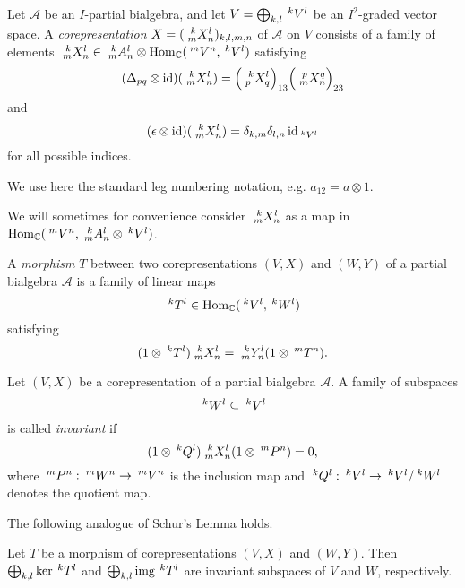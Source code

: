 \begin{Def} Let $\mathscr{A}$ be an $I$-partial bialgebra, and let $V=\bigoplus_{k,l} \Gru{V}{k}{l}$ be an $I^{2}$-graded vector space.
A \emph{corepresentation}  $X=(\Gr{X}{k}{l}{m}{n})_{k,l,m,n}$ of $\mathscr{A}$ on $V$ consists of a family of elements 
  $\Gr{X}{k}{l}{m}{n} \in \Gr{A}{k}{l}{m}{n} \otimes
  \Hom_\C(\Gru{V}{m}{n},\Gru{V}{k}{l})$
  satisfying
  \begin{align} \label{eq:rep-delta}
    (\Delta_{pq} \otimes \id)(\Gr{X}{k}{l}{m}{n}) =
    \Big{(}\Gr{X}{k}{l}{p}{q}\Big{)}_{13}\Big{(}\Gr{X}{p}{q}{m}{n}\Big{)}_{23}
  \end{align}
and   \[(\epsilon \otimes
    \id)(\Gr{X}{k}{l}{m}{n})=\delta_{k,m}\delta_{l,n}\id_{\Gru{V}{k}{l}}\] 
for all possible indices.
\end{Def} %

We use here the standard leg numbering notation, e.g. $a_{12} = a\otimes 1$.

We will sometimes for convenience consider $\Gr{X}{k}{l}{m}{n}$ as a map in $\Hom_\C(\Gru{V}{m}{n},\Gr{A}{k}{l}{m}{n}\otimes \Gru{V}{k}{l})$. %

\begin{Def}\label{DefMorphism} A \emph{morphism} $T$ between two corepresentations
$(V,X)$ and $(W,Y)$ of a partial bialgebra $\mathscr{A}$ is a family of linear maps
\[\Gru{T}{k}{l} \in
\Hom_\C(\Gru{V}{k}{l},\Gru{W}{k}{l})\]
satisfying \[(1 \otimes \Gru{T}{k}{l})\Gr{X}{k}{l}{m}{n} = \Gr{Y}{k}{l}{m}{n}(1 \otimes \Gru{T}{m}{n}).\]
\end{Def}

\begin{Def} Let $(V,X)$ be a
corepresentation of a partial bialgebra $\mathscr{A}$. A family of subspaces
\[\Gru{W}{k}{l} \subseteq \Gru{V}{k}{l}\]
is called \emph{invariant} if \[(1\otimes \Gru{Q}{k}{l})\Gr{X}{k}{l}{m}{n}(1 \otimes \Gru{P}{m}{n}) =0,\]
where $\Gru{P}{m}{n}:\Gru{W}{m}{n}\to\Gru{V}{m}{n}$ is the inclusion map and $\Gru{Q}{k}{l}:\Gru{V}{k}{l}\to\Gru{V}{k}{l}/\Gru{W}{k}{l}$
denotes the quotient map.
\end{Def}

The following analogue of Schur's Lemma holds.

\begin{Lem} Let $T$ be a morphism
of corepresentations $(V,X)$ and
$(W,Y)$. Then $ \bigoplus_{k,l} \ker \Gru{T}{k}{l}$ and
$\bigoplus_{k,l} \img \Gru{T}{k}{l}$ are invariant subspaces of
$V$ and $W$, respectively.
\end{Lem} 

